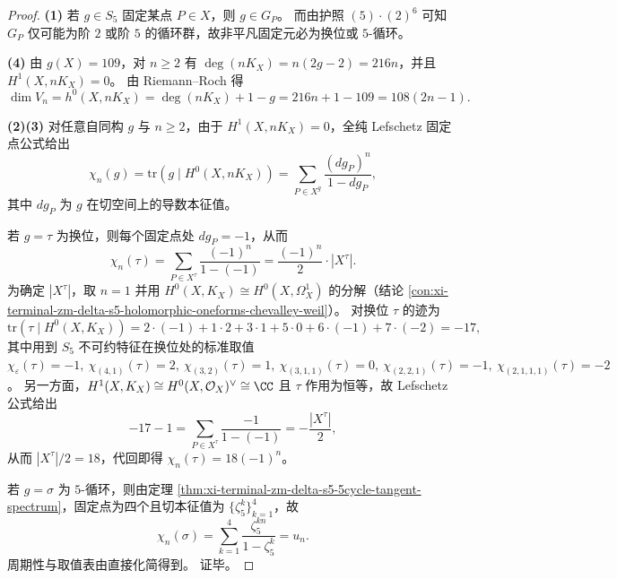 \begin{proof}
\textbf{(1)} 若 \(g\in S_5\) 固定某点 \(P\in X\)，则 \(g\in G_P\)。
而由护照 \((5)\cdot(2)^6\) 可知 \(G_P\) 仅可能为阶 \(2\) 或阶 \(5\) 的循环群，故非平凡固定元必为换位或 \(5\)-循环。
\par
\textbf{(4)} 由 \(g(X)=109\)，对 \(n\ge 2\) 有 \(\deg(nK_X)=n(2g-2)=216n\)，并且 \(H^1(X,nK_X)=0\)。
由 Riemann--Roch 得
\[
\dim V_n=h^0(X,nK_X)=\deg(nK_X)+1-g=216n+1-109=108(2n-1).
\]
\par
\textbf{(2)(3)} 对任意自同构 \(g\) 与 \(n\ge 2\)，由于 \(H^1(X,nK_X)=0\)，全纯 Lefschetz 固定点公式给出
\[
\chi_n(g)=\mathrm{tr}\!\left(g\mid H^0(X,nK_X)\right)
=\sum_{P\in X^g}\frac{(dg_P)^n}{1-dg_P},
\]
其中 \(dg_P\) 为 \(g\) 在切空间上的导数本征值。
\par
若 \(g=\tau\) 为换位，则每个固定点处 \(dg_P=-1\)，从而
\[
\chi_n(\tau)=\sum_{P\in X^\tau}\frac{(-1)^n}{1-(-1)}
=\frac{(-1)^n}{2}\cdot |X^\tau|.
\]
为确定 \(|X^\tau|\)，取 \(n=1\) 并用 \(H^0(X,K_X)\cong H^0(X,\Omega_X^1)\) 的分解（结论 \ref{con:xi-terminal-zm-delta-s5-holomorphic-oneforms-chevalley-weil}）。
对换位 \(\tau\) 的迹为
\[
\mathrm{tr}\!\left(\tau\mid H^0(X,K_X)\right)
=2\cdot(-1)+1\cdot 2+3\cdot 1+5\cdot 0+6\cdot(-1)+7\cdot(-2)
=-17,
\]
其中用到 \(S_5\) 不可约特征在换位处的标准取值
\(
\chi_\varepsilon(\tau)=-1,\ \chi_{(4,1)}(\tau)=2,\ \chi_{(3,2)}(\tau)=1,\ \chi_{(3,1,1)}(\tau)=0,\ \chi_{(2,2,1)}(\tau)=-1,\ \chi_{(2,1,1,1)}(\tau)=-2
\)。
另一方面，\(H^1(X,K_X)\cong H^0(X,\mathcal O_X)^\vee\cong\CC\) 且 \(\tau\) 作用为恒等，故 Lefschetz 公式给出
\[
-17-1=\sum_{P\in X^\tau}\frac{-1}{1-(-1)}=-\frac{|X^\tau|}{2},
\]
从而 \(|X^\tau|/2=18\)，代回即得 \(\chi_n(\tau)=18(-1)^n\)。
\par
若 \(g=\sigma\) 为 \(5\)-循环，则由定理 \ref{thm:xi-terminal-zm-delta-s5-5cycle-tangent-spectrum}，固定点为四个且切本征值为 \(\{\zeta_5^k\}_{k=1}^4\)，故
\[
\chi_n(\sigma)=\sum_{k=1}^4\frac{\zeta_5^{kn}}{1-\zeta_5^k}=u_n.
\]
周期性与取值表由直接化简得到。
证毕。
\end{proof}

